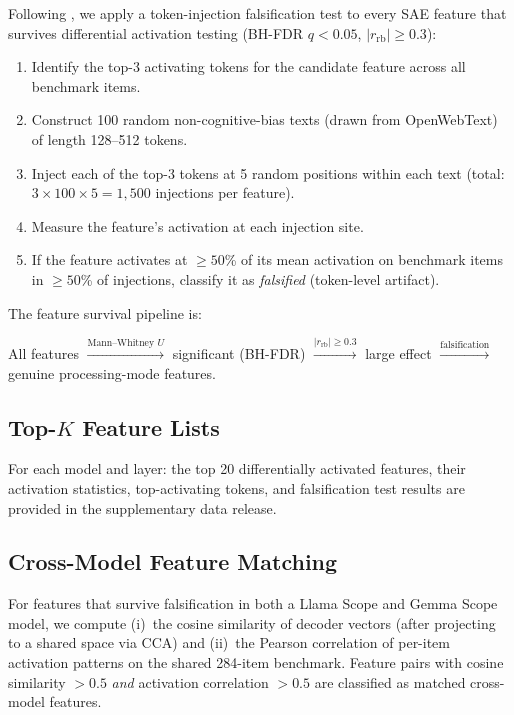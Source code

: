 Following \citet{ma2026falsification}, we apply a token-injection
falsification test to every SAE feature that survives differential
activation testing (BH-FDR $q < 0.05$, $|r_{\text{rb}}| \geq 0.3$):
\begin{enumerate}[leftmargin=*,itemsep=1pt]
  \item Identify the top-3 activating tokens for the candidate feature
  across all benchmark items.
  \item Construct 100 random non-cognitive-bias texts (drawn from
  OpenWebText) of length 128--512 tokens.
  \item Inject each of the top-3 tokens at 5 random positions within each
  text (total: $3 \times 100 \times 5 = 1{,}500$ injections per feature).
  \item Measure the feature's activation at each injection site.
  \item If the feature activates at $\geq 50$\% of its mean activation on
  benchmark items in $\geq 50$\% of injections, classify it as
  \emph{falsified} (token-level artifact).
\end{enumerate}

\noindent
The feature survival pipeline is:
\begin{center}
\small
All features $\xrightarrow{\text{Mann--Whitney } U}$ significant (BH-FDR)
$\xrightarrow{|r_{\text{rb}}| \geq 0.3}$ large effect
$\xrightarrow{\text{falsification}}$ genuine processing-mode features.
\end{center}

\subsection{Top-$K$ Feature Lists}

For each model and layer: the top 20 differentially activated features,
their activation statistics, top-activating tokens, and falsification test
results are provided in the supplementary data release.

\subsection{Cross-Model Feature Matching}

For features that survive falsification in both a Llama Scope and Gemma
Scope model, we compute (i)~the cosine similarity of decoder vectors
(after projecting to a shared space via CCA) and (ii)~the Pearson
correlation of per-item activation patterns on the shared 284-item
benchmark.  Feature pairs with cosine similarity $> 0.5$ \emph{and}
activation correlation $> 0.5$ are classified as matched cross-model
features.


